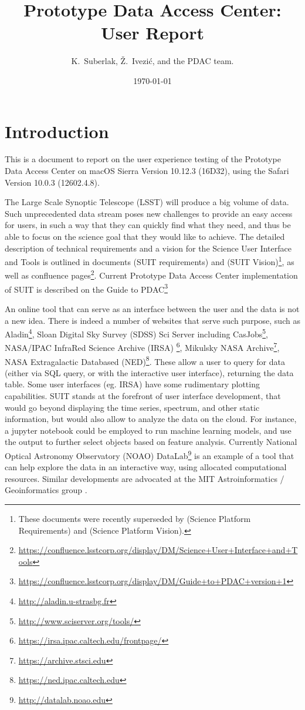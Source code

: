 \documentclass[DM,lsstdraft,toc]{lsstdoc}
\title[PDAC report]{Prototype Data Access Center: User Report}
\author{
K.~Suberlak,
\v{Z}.~Ivezi\'c,
and the PDAC team.}
\date{\today}
\begin{document}
\maketitle

\section{Introduction}

This is a document to report on the user experience testing of the Prototype Data Access Center  on  macOS Sierra Version 10.12.3 (16D32), using the Safari Version 10.0.3 (12602.4.8).

 The Large Scale Synoptic Telescope (LSST) will produce a big volume of data. Such unprecedented data stream poses new challenges  to provide an easy access for users, in such a way that they can quickly find what they need, and thus be able to focus on the science goal that they would like to achieve.  The detailed description of  technical requirements and a vision for the Science User Interface and Tools is outlined in documents  (SUIT requirements) and   (SUIT Vision)\footnote{These documents were recently superseded by  (Science Platform Requirements) and  (Science Platform Vision).}, as well as confluence pages\footnote{\url{https://confluence.lsstcorp.org/display/DM/Science+User+Interface+and+Tools}}. Current Prototype Data Access Center implementation of SUIT is described on the Guide to PDAC\footnote{\url{https://confluence.lsstcorp.org/display/DM/Guide+to+PDAC+version+1}\label{note1}}

An online tool that can serve as an interface between the user and the data is not a new idea.  There is indeed a number of websites that serve such purpose, such as  Aladin\footnote{\url{http://aladin.u-strasbg.fr}},  Sloan Digital Sky Survey (SDSS) Sci Server including CasJobs\footnote{\url{http://www.sciserver.org/tools/}},  NASA/IPAC  InfraRed  Science Archive (IRSA) \footnote{\url{https://irsa.ipac.caltech.edu/frontpage/}},  Mikulsky NASA Archive\footnote{\url{https://archive.stsci.edu}}, NASA Extragalactic Databased (NED)\footnote{\url{https://ned.ipac.caltech.edu}}. These allow a user to query for data (either via SQL query, or with the interactive user interface), returning the data table. Some user interfaces (eg. IRSA) have some rudimentary plotting capabilities.  SUIT stands at the forefront of user interface development, that would go beyond displaying the time series, spectrum, and other static information, but would also allow to analyze the data on the cloud. For instance,  a jupyter notebook could be employed to run machine learning models, and use the output to further select objects based on feature analysis. Currently National Optical Astronomy Observatory (NOAO)  DataLab\footnote{\url{http://datalab.noao.edu}} is an example of a tool that can help explore the data in an interactive way, using allocated computational resources. Similar developments are advocated at the MIT Astroinformatics / Geoinformatics group \citep{Pankratius:7515118,Coster:2014:ION}.
\end{document}
